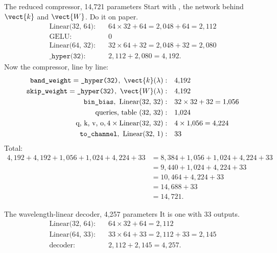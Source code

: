 \begin{worked}[label={we:specdecoder:redparams}]{The reduced compressor, 14,721 parameters}
Start with , the network behind $\vect{k}$ and $\vect{W}$. Do it on paper.
\begin{align*}
  \text{Linear(32, 64)}:&\quad 64\times32 + 64 = 2{,}048 + 64 = 2{,}112\\
  \text{GELU}:&\quad 0\\
  \text{Linear(64, 32)}:&\quad 32\times64 + 32 = 2{,}048 + 32 = 2{,}080\\
  \texttt{\_hyper(32)}:&\quad 2{,}112 + 2{,}080 = 4{,}192 .
\end{align*}
Now the compressor, line by line:
\begin{align*}
  \texttt{band\_weight} = \texttt{\_hyper(32)}, \ \vect{k}(\lambda):&\quad 4{,}192\\
  \texttt{skip\_weight} = \texttt{\_hyper(32)}, \ \vect{W}(\lambda):&\quad 4{,}192\\
  \texttt{bin\_bias}, \text{ Linear(32, 32)}:&\quad 32\times32 + 32 = 1{,}056\\
  \text{queries, table (32, 32)}:&\quad 1{,}024\\
  \text{q, k, v, o}, 4\times\text{Linear(32, 32)}:&\quad 4\times1{,}056 = 4{,}224\\
  \texttt{to\_channel}, \text{ Linear(32, 1)}:&\quad 33
\end{align*}
Total:
\begin{align*}
  4{,}192 + 4{,}192 + 1{,}056 + 1{,}024 + 4{,}224 + 33 &= 8{,}384 + 1{,}056 + 1{,}024 + 4{,}224 + 33\\
  &= 9{,}440 + 1{,}024 + 4{,}224 + 33\\
  &= 10{,}464 + 4{,}224 + 33\\
  &= 14{,}688 + 33\\
  &= 14{,}721 .
\end{align*}
\end{worked}

\begin{worked}[label={we:specdecoder:wldparams}]{The wavelength-linear decoder, 4,257 parameters}
It is one  with 33 outputs.
\begin{align*}
  \text{Linear(32, 64)}:&\quad 64\times32 + 64 = 2{,}112\\
  \text{Linear(64, 33)}:&\quad 33\times64 + 33 = 2{,}112 + 33 = 2{,}145\\
  \text{decoder}:&\quad 2{,}112 + 2{,}145 = 4{,}257 .
\end{align*}
\end{worked}

